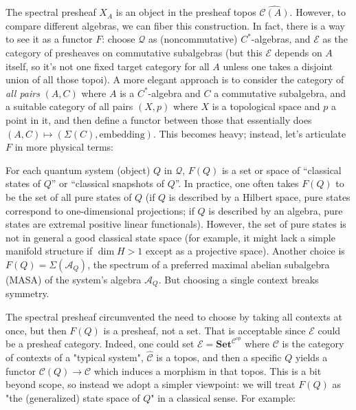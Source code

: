 \medskip

The spectral presheaf $X_A$ is an object in the presheaf topos $\widehat{\mathcal{C}(A)}$. However, to compare different algebras, we can fiber this construction. In fact, there is a way to see it as a functor $F$: choose $\mathcal{Q}$ as (noncommutative) $C^*$-algebras, and $\mathcal{E}$ as the category of presheaves on commutative subalgebras (but this $\mathcal{E}$ depends on $A$ itself, so it's not one fixed target category for all $A$ unless one takes a disjoint union of all those topoi). A more elegant approach is to consider the category of \emph{all pairs} $(A,C)$ where $A$ is a $C^*$-algebra and $C$ a commutative subalgebra, and a suitable category of all pairs $(X,p)$ where $X$ is a topological space and $p$ a point in it, and then define a functor between those that essentially does $(A,C) \mapsto (\Sigma(C), \text{embedding})$. This becomes heavy; instead, let's articulate $F$ in more physical terms:

\medskip

For each quantum system (object) $Q$ in $\mathcal{Q}$, $F(Q)$ is a set or space of ``classical states of $Q$'' or ``classical snapshots of $Q$''. In practice, one often takes $F(Q)$ to be the set of all pure states of $Q$ (if $Q$ is described by a Hilbert space, pure states correspond to one-dimensional projections; if $Q$ is described by an algebra, pure states are extremal positive linear functionals). However, the set of pure states is not in general a good classical state space (for example, it might lack a simple manifold structure if $\dim H>1$ except as a projective space). Another choice is $F(Q) = \Sigma(\mathcal{A}_Q)$, the spectrum of a preferred maximal abelian subalgebra (MASA) of the system's algebra $\mathcal{A}_Q$. But choosing a single context breaks symmetry.

\medskip

The spectral presheaf circumvented the need to choose by taking all contexts at once, but then $F(Q)$ is a presheaf, not a set. That is acceptable since $\mathcal{E}$ could be a presheaf category. Indeed, one could set $\mathcal{E} = \mathbf{Set}^{\mathcal{C}^{op}}$ where $\mathcal{C}$ is the category of contexts of a "typical system", $\widehat{\mathcal{C}}$ is a topos, and then a specific $Q$ yields a functor $\mathcal{C}(Q) \to \mathcal{C}$ which induces a morphism in that topos. This is a bit beyond scope, so instead we adopt a simpler viewpoint:
we will treat
$F(Q)$
as "the (generalized) state space of $Q$" in a classical sense. For example:

